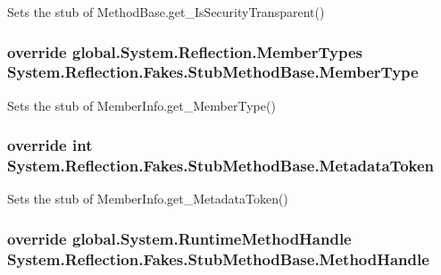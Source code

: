 Sets the stub of Method\-Base.\-get\-\_\-\-Is\-Security\-Transparent()

\hypertarget{class_system_1_1_reflection_1_1_fakes_1_1_stub_method_base_a003eb51993c1aa18b8d81170379bf542}{
\subsubsection[{Member\-Type}]{\setlength{\rightskip}{0pt plus 5cm}override global.\-System.\-Reflection.\-Member\-Types System.\-Reflection.\-Fakes.\-Stub\-Method\-Base.\-Member\-Type\hspace{0.3cm}{\ttfamily [get]}}}\label{class_system_1_1_reflection_1_1_fakes_1_1_stub_method_base_a003eb51993c1aa18b8d81170379bf542}


Sets the stub of Member\-Info.\-get\-\_\-\-Member\-Type()

\hypertarget{class_system_1_1_reflection_1_1_fakes_1_1_stub_method_base_aa2f6d4b55549fa4bc3bc74f7f3ab2182}{
\subsubsection[{Metadata\-Token}]{\setlength{\rightskip}{0pt plus 5cm}override int System.\-Reflection.\-Fakes.\-Stub\-Method\-Base.\-Metadata\-Token\hspace{0.3cm}{\ttfamily [get]}}}\label{class_system_1_1_reflection_1_1_fakes_1_1_stub_method_base_aa2f6d4b55549fa4bc3bc74f7f3ab2182}


Sets the stub of Member\-Info.\-get\-\_\-\-Metadata\-Token()

\hypertarget{class_system_1_1_reflection_1_1_fakes_1_1_stub_method_base_a6f16c6136fe17bad33cece1a59645dd0}{
\subsubsection[{Method\-Handle}]{\setlength{\rightskip}{0pt plus 5cm}override global.\-System.\-Runtime\-Method\-Handle System.\-Reflection.\-Fakes.\-Stub\-Method\-Base.\-Method\-Handle\hspace{0.3cm}{\ttfamily [get]}}}\label{class_system_1_1_reflection_1_1_fakes_1_1_stub_method_base_a6f16c6136fe17bad33cece1a59645dd0}


